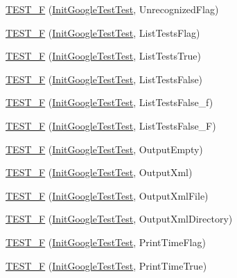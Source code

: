 \begin{DoxyCompactItemize}
\item 
\hyperlink{namespacetesting_a1572c861f65ca8d5dfb61246a32a2799}{T\-E\-S\-T\-\_\-\-F} (\hyperlink{classtesting_1_1_init_google_test_test}{Init\-Google\-Test\-Test}, Unrecognized\-Flag)
\item 
\hyperlink{namespacetesting_a1d111e67e0c6411085ff6d0911f50d18}{T\-E\-S\-T\-\_\-\-F} (\hyperlink{classtesting_1_1_init_google_test_test}{Init\-Google\-Test\-Test}, List\-Tests\-Flag)
\item 
\hyperlink{namespacetesting_a000181c6b1ac347a3d7797324808ea8d}{T\-E\-S\-T\-\_\-\-F} (\hyperlink{classtesting_1_1_init_google_test_test}{Init\-Google\-Test\-Test}, List\-Tests\-True)
\item 
\hyperlink{namespacetesting_acc2334b947370b550b7d6241e0d34124}{T\-E\-S\-T\-\_\-\-F} (\hyperlink{classtesting_1_1_init_google_test_test}{Init\-Google\-Test\-Test}, List\-Tests\-False)
\item 
\hyperlink{namespacetesting_a60e2b7e1cf88c2af6e04055b3afe7cbe}{T\-E\-S\-T\-\_\-\-F} (\hyperlink{classtesting_1_1_init_google_test_test}{Init\-Google\-Test\-Test}, List\-Tests\-False\-\_\-f)
\item 
\hyperlink{namespacetesting_a4933b012108ecb88243c2dbc13d7665b}{T\-E\-S\-T\-\_\-\-F} (\hyperlink{classtesting_1_1_init_google_test_test}{Init\-Google\-Test\-Test}, List\-Tests\-False\-\_\-\-F)
\item 
\hyperlink{namespacetesting_a121894d4edf72b1dbabdcde2bebd745d}{T\-E\-S\-T\-\_\-\-F} (\hyperlink{classtesting_1_1_init_google_test_test}{Init\-Google\-Test\-Test}, Output\-Empty)
\item 
\hyperlink{namespacetesting_a90df70c45f67d4c0dbc5bd29f7be3361}{T\-E\-S\-T\-\_\-\-F} (\hyperlink{classtesting_1_1_init_google_test_test}{Init\-Google\-Test\-Test}, Output\-Xml)
\item 
\hyperlink{namespacetesting_a810f99da1185404f8a899c919ee6433e}{T\-E\-S\-T\-\_\-\-F} (\hyperlink{classtesting_1_1_init_google_test_test}{Init\-Google\-Test\-Test}, Output\-Xml\-File)
\item 
\hyperlink{namespacetesting_ac351c3065ee89f7eb2fbba809db5c61d}{T\-E\-S\-T\-\_\-\-F} (\hyperlink{classtesting_1_1_init_google_test_test}{Init\-Google\-Test\-Test}, Output\-Xml\-Directory)
\item 
\hyperlink{namespacetesting_aa832ff8ffe6b687c7025cbc766973e0b}{T\-E\-S\-T\-\_\-\-F} (\hyperlink{classtesting_1_1_init_google_test_test}{Init\-Google\-Test\-Test}, Print\-Time\-Flag)
\item 
\hyperlink{namespacetesting_ae0f76bbca8e2bf7d9de60c4b8b0dfa16}{T\-E\-S\-T\-\_\-\-F} (\hyperlink{classtesting_1_1_init_google_test_test}{Init\-Google\-Test\-Test}, Print\-Time\-True)

\end{DoxyCompactItemize}
